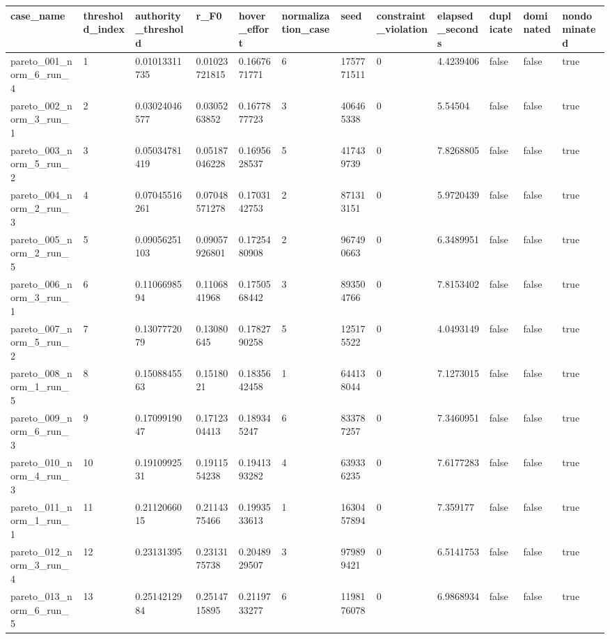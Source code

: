 \begin{tabular}{@{}llllllllllll@{}}
\toprule
case\_name & threshold\_index & authority\_threshold & r\_F0 & hover\_effort & normalization\_case & seed & constraint\_violation & elapsed\_seconds & duplicate & dominated & nondominated \\
\midrule
pareto\_001\_norm\_6\_run\_4 & 1 & 0.01013311735 & 0.01023721815 & 0.1667671771 & 6 & 1757771511 & 0 & 4.4239406 & false & false & true \\
pareto\_002\_norm\_3\_run\_1 & 2 & 0.03024046577 & 0.0305263852 & 0.1677877723 & 3 & 406465338 & 0 & 5.54504 & false & false & true \\
pareto\_003\_norm\_5\_run\_2 & 3 & 0.05034781419 & 0.05187046228 & 0.1695628537 & 5 & 417439739 & 0 & 7.8268805 & false & false & true \\
pareto\_004\_norm\_2\_run\_3 & 4 & 0.07045516261 & 0.07048571278 & 0.1703142753 & 2 & 871313151 & 0 & 5.9720439 & false & false & true \\
pareto\_005\_norm\_2\_run\_5 & 5 & 0.09056251103 & 0.09057926801 & 0.1725480908 & 2 & 967490663 & 0 & 6.3489951 & false & false & true \\
pareto\_006\_norm\_3\_run\_1 & 6 & 0.1106698594 & 0.1106841968 & 0.1750568442 & 3 & 893504766 & 0 & 7.8153402 & false & false & true \\
pareto\_007\_norm\_5\_run\_2 & 7 & 0.1307772079 & 0.13080645 & 0.1782790258 & 5 & 125175522 & 0 & 4.0493149 & false & false & true \\
pareto\_008\_norm\_1\_run\_5 & 8 & 0.1508845563 & 0.1518021 & 0.1835642458 & 1 & 644138044 & 0 & 7.1273015 & false & false & true \\
pareto\_009\_norm\_6\_run\_3 & 9 & 0.1709919047 & 0.1712304413 & 0.189345247 & 6 & 833787257 & 0 & 7.3460951 & false & false & true \\
pareto\_010\_norm\_4\_run\_3 & 10 & 0.1910992531 & 0.1911554238 & 0.1941393282 & 4 & 639336235 & 0 & 7.6177283 & false & false & true \\
pareto\_011\_norm\_1\_run\_1 & 11 & 0.2112066015 & 0.2114375466 & 0.1993533613 & 1 & 1630457894 & 0 & 7.359177 & false & false & true \\
pareto\_012\_norm\_3\_run\_4 & 12 & 0.23131395 & 0.2313175738 & 0.2048929507 & 3 & 979899421 & 0 & 6.5141753 & false & false & true \\
pareto\_013\_norm\_6\_run\_5 & 13 & 0.2514212984 & 0.2514715895 & 0.2119733277 & 6 & 1198176078 & 0 & 6.9868934 & false & false & true \\

\end{tabular}
